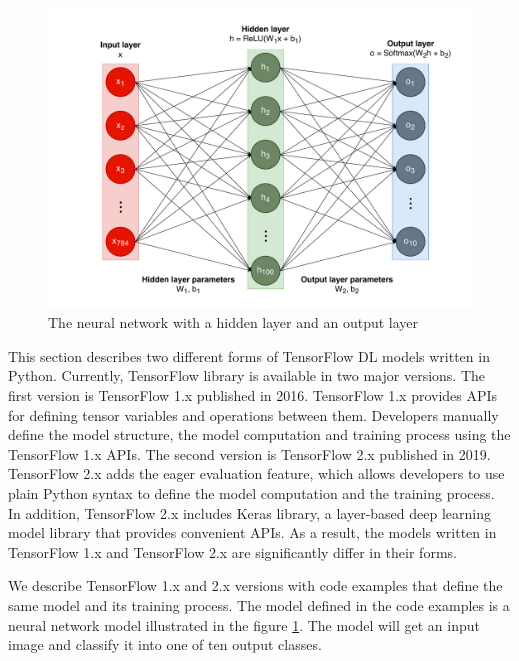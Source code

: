 \begin{figure}[ht!]
\includegraphics[width=\textwidth]{mnist_model.pdf}
  \caption{The neural network with a hidden layer and an output layer}
\label{fig:back:model}
\end{figure}

This section describes two different forms of TensorFlow DL models written in
Python.
Currently, TensorFlow library is available in two major versions.
The first version is TensorFlow 1.x published in 2016.
TensorFlow 1.x provides APIs for defining tensor variables and
operations between them.
Developers manually define the model structure, the model computation
and training process using the TensorFlow 1.x APIs.
The second version is TensorFlow 2.x published in 2019.
TensorFlow 2.x adds the eager evaluation feature,
which allows developers to use plain Python syntax to define the model
computation and the training process.
In addition, TensorFlow 2.x includes Keras library, 
a layer-based deep learning model library that provides convenient APIs.
As a result, the models written in TensorFlow 1.x and TensorFlow 2.x are
significantly differ in their forms. 

We describe TensorFlow 1.x and 2.x versions with code examples that define
the same model and its training process.
The model defined in the code examples is a neural network model illustrated
in the figure \ref{fig:back:model}.
The model will get an input image and classify it into one of ten
output classes.
 
